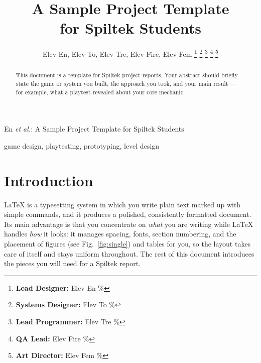 \documentclass[a4paper,twoside,twocolumn]{IEEEtran}
\begin{document}

\title{A Sample Project Template\\ for Spiltek Students}

\author{Elev En, Elev To, Elev Tre, Elev Fire, Elev Fem%
  \thanks{\textbf{Lead Designer:} Elev En \%}%
  \thanks{\textbf{Systems Designer:} Elev To \%}%
  \thanks{\textbf{Lead Programmer:} Elev Tre \%}%
  \thanks{\textbf{QA Lead:} Elev Fire \%}%
  \thanks{\textbf{Art Director:} Elev Fem \%}
}

%
{En \MakeLowercase{\textit{et al.}}: A Sample Project Template for Spiltek Students}

\maketitle



\begin{abstract}
This document is a template for Spiltek project reports. Your abstract should
briefly state the game or system you built, the approach you took, and your main
result --- for example, what a playtest revealed about your core mechanic.
\end{abstract}


\begin{IEEEkeywords}
game design, playtesting, prototyping, level design
\end{IEEEkeywords}



\section{Introduction}

LaTeX is a typesetting system in which you write plain text marked up with simple
commands, and it produces a polished, consistently formatted document. Its main
advantage is that you concentrate on \emph{what} you are writing while LaTeX
handles \emph{how} it looks: it manages spacing, fonts, section numbering, and
the placement of figures (see Fig.~\ref{fig:single}) and tables for you, 
so the layout takes care of itself and stays uniform throughout. 
The rest of this document introduces the pieces you will need for a Spiltek report.
\end{document}
